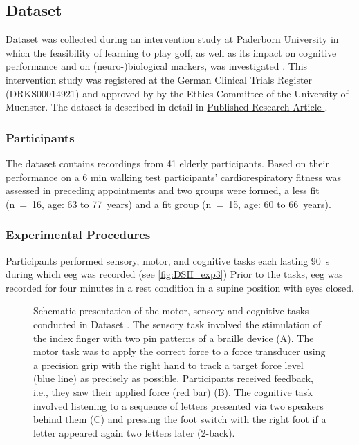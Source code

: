 \subsection{Dataset }
\label{methods:datasets:III}
Dataset  was collected during an intervention study at Paderborn University in which the feasibility of learning to play golf, as well as its impact on cognitive performance and on (neuro-)biological markers, was investigated \cite{Ströhlein2020,Stroehlein2021,Gowik2023}. This intervention study was registered at the German Clinical Trials Register (DRKS00014921) and approved by by the Ethics Committee of the University of Muenster. The dataset is described in detail in \hyperref[pub:paperIII]{Published Research Article }. 

\subsubsection{Participants}
\label{methods:datasets:III:participants}
The dataset contains recordings from 41 elderly participants. Based on their performance on a 6 min walking test participants’ cardiorespiratory fitness was assessed in preceding appointments and two groups were formed, a less fit (n~=~16, age: 63 to 77~years) and a fit group (n~=~15, age: 60 to 66~years).

\subsubsection{Experimental Procedures}
\label{methods:datasets:III:experiment}
Participants performed sensory, motor, and cognitive tasks each lasting 90~s during which \gls{eeg} was recorded (see \autoref{fig:DSII_exp3}) Prior to the tasks, \gls{eeg} was recorded for four minutes in a rest condition in a supine position with eyes closed.

\begin{figure}[h]
\begin{center}

\caption[Schematic presentation of the motor, sensory and cognitive tasks conducted in Dataset .]{Schematic presentation of the motor, sensory and cognitive tasks conducted in Dataset . The sensory task involved the stimulation of the index finger with two pin patterns of a braille device (A). The motor task was to apply the correct force to a force transducer using a precision grip with the right hand to track a target force level (blue line) as precisely as possible. Participants received feedback, i.e., they saw their applied force (red bar) (B). The cognitive task involved listening to a sequence of letters presented via two speakers behind them (C) and pressing the foot switch with the right foot if a letter appeared again two letters later (2-back).}
\label{fig:DSII_exp3}
\end{center}
\end{figure}

